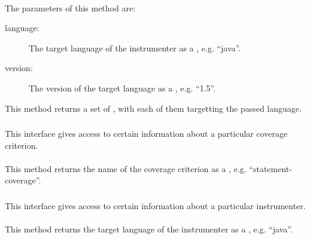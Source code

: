 \paragraph{} \label{Classes:Instrumentation:InstrumenterProvider:getInstrumenterDescriptors_language_version}
The parameters of this method are:
\begin{description}
\item[language:] The target language of the instrumenter as a , e.g. ``java''.
\item[version:] The version of the target language as a , e.g. ``1.5''.

\end{description}
This method returns a set of , with each of them targetting the passed language.

\subsubsection{} \label{Classes:Instrumentation:Criterion}

This interface gives access to certain information about a particular coverage criterion.

\paragraph{} \label{Classes:Instrumentation:Criterion:getName}
This method returns the name of the coverage criterion as a , e.g. ``statement-coverage''.

\subsubsection{} \label{Classes:Instrumentation:InstrumenterDescriptor}

This interface gives access to certain information about a particular instrumenter.

\paragraph{} \label{Classes:Instrumentation:InstrumenterDescriptor:getLanguage}
This method returns the  target language of the instrumenter as a , e.g. ``java''.
